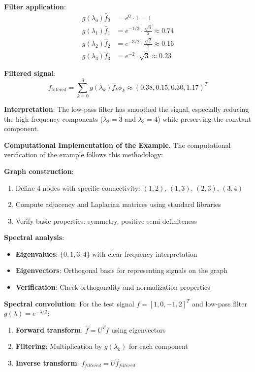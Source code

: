 \begin{example}
\textbf{Filter application}:
\begin{align}
g(\lambda_0) \hat{f}_0 &= e^{0} \cdot 1 = 1 \\
g(\lambda_1) \hat{f}_1 &= e^{-1/2} \cdot \tfrac{\sqrt{6}}{2} \approx 0.74 \\
g(\lambda_2) \hat{f}_2 &= e^{-3/2} \cdot \tfrac{\sqrt{2}}{2} \approx 0.16 \\
g(\lambda_3) \hat{f}_3 &= e^{-2} \cdot \sqrt{3} \approx 0.23
\end{align}

\textbf{Filtered signal}:
\begin{equation}
f_{\text{filtered}} = \sum_{k=0}^{3} g(\lambda_k)\hat{f}_k \phi_k \approx (0.38, 0.15, 0.30, 1.17)^T
\end{equation}

\textbf{Interpretation}: The low-pass filter has smoothed the signal, especially reducing the high-frequency components ($\lambda_2 = 3$ and $\lambda_3 = 4$) while preserving the constant component.
\end{example}

\textbf{Computational Implementation of the Example.} The computational verification of the example follows this methodology:

\textbf{Graph construction}:
\begin{enumerate}
    \item Define 4 nodes with specific connectivity: $(1,2)$, $(1,3)$, $(2,3)$, $(3,4)$
    \item Compute adjacency and Laplacian matrices using standard libraries
    \item Verify basic properties: symmetry, positive semi-definiteness
\end{enumerate}

\textbf{Spectral analysis}:
\begin{itemize}
    \item \textbf{Eigenvalues}: $\{0, 1, 3, 4\}$ with clear frequency interpretation
    \item \textbf{Eigenvectors}: Orthogonal basis for representing signals on the graph
    \item \textbf{Verification}: Check orthogonality and normalization properties
\end{itemize}

\textbf{Spectral convolution}:
For the test signal $f = [1, 0, -1, 2]^T$ and low-pass filter $g(\lambda) = e^{-\lambda/2}$:
\begin{enumerate}
    \item \textbf{Forward transform}: $\hat{f} = U^T f$ using eigenvectors
    \item \textbf{Filtering}: Multiplication by $g(\lambda_k)$ for each component
    \item \textbf{Inverse transform}: $f_{filtered} = U \hat{f}_{filtered}$
\end{enumerate}


